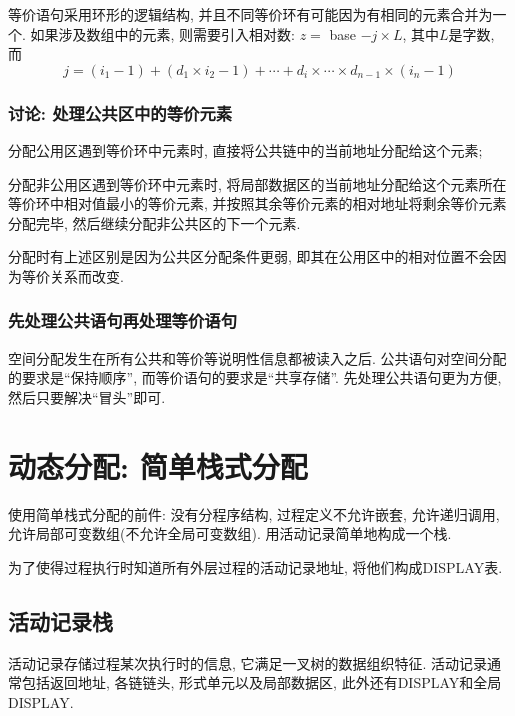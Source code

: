                 等价语句采用环形的逻辑结构, 并且不同等价环有可能因为有相同的元素合并为一个. 如果涉及数组中的元素, 则需要引入\textsf{相对数}: $z=$ base $-j\times L$, 其中$L$是字数, 而
                \[j=(i_1-1)+(d_1\times i_2-1)+\cdots+d_i\times\cdots\times d_{n-1}\times(i_n-1)\]

            \subsubsection{讨论: 处理公共区中的等价元素}

                分配公用区遇到等价环中元素时, 直接将公共链中的当前地址分配给这个元素;

                分配非公用区遇到等价环中元素时, 将局部数据区的当前地址分配给这个元素所在等价环中相对值最小的等价元素, 并按照其余等价元素的相对地址将剩余等价元素分配完毕, 然后继续分配非公共区的下一个元素.

                分配时有上述区别是因为公共区分配条件更弱, 即其在公用区中的相对位置不会因为等价关系而改变.

            \subsubsection{先处理公共语句再处理等价语句}

                空间分配发生在所有公共和等价等说明性信息都被读入之后. 公共语句对空间分配的要求是``保持顺序'', 而等价语句的要求是``共享存储''. 先处理公共语句更为方便, 然后只要解决``冒头''即可.

    \section{动态分配: 简单栈式分配}

        使用简单栈式分配的前件: 没有分程序结构, 过程定义不允许嵌套, 允许递归调用, 允许局部可变数组(不允许全局可变数组). 用活动记录简单地构成一个栈.

        为了使得过程执行时知道所有外层过程的活动记录地址, 将他们构成DISPLAY表. 

        \subsection{活动记录栈}

            \textsf{活动记录}存储过程某次执行时的信息, 它满足一叉树的数据组织特征. 活动记录通常包括返回地址, 各链链头, 形式单元以及局部数据区, 此外还有DISPLAY和全局DISPLAY.
